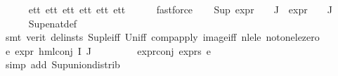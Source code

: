 \begin{isabellebody}
\ \ \ \ \isamarkupfalse%
\ e{}{\isacharunderscore}{\kern0pt}tt\ e{}{\isacharunderscore}{\kern0pt}tt\ e{}{\isacharunderscore}{\kern0pt}tt\ e{}{\isacharunderscore}{\kern0pt}tt\ e{}{\isacharunderscore}{\kern0pt}tt\ e{}{\isacharunderscore}{\kern0pt}tt\isanewline
\ \ \ \ \isamarkupfalse%
\ fastforce{\isacharplus}{\kern0pt}\isanewline
\ \ \isamarkupfalse%
\ {\isachardoublequoteopen}{\isacharparenleft}{\kern0pt}Sup\ {\isacharparenleft}{\kern0pt}{\isacharparenleft}{\kern0pt}expr{\isacharunderscore}{\kern0pt}{}\ {\isasymcirc}\ {\isasymPhi}{\isacharparenright}{\kern0pt}\ {\isacharbackquote}{\kern0pt}\ J\ {\isasymunion}\ {\isacharparenleft}{\kern0pt}expr{\isacharunderscore}{\kern0pt}{}\ {\isasymcirc}\ {\isasymPhi}{\isacharparenright}{\kern0pt}\ {\isacharbackquote}{\kern0pt}\ J{\isacharparenright}{\kern0pt}{\isacharparenright}{\kern0pt}\ {\isasymle}\ {}{\isachardoublequoteclose}\isanewline
\ \ \ \ \isamarkupfalse%
\ Sup{\isacharunderscore}{\kern0pt}enat{\isacharunderscore}{\kern0pt}def\isanewline
\ \ \ \ \isamarkupfalse%
\ {\isacharparenleft}{\kern0pt}smt\ {\isacharparenleft}{\kern0pt}verit{\isacharcomma}{\kern0pt}\ del{\isacharunderscore}{\kern0pt}insts{\isacharparenright}{\kern0pt}\ Sup{\isacharunderscore}{\kern0pt}le{\isacharunderscore}{\kern0pt}iff\ Un{\isacharunderscore}{\kern0pt}iff\ comp{\isacharunderscore}{\kern0pt}apply\ image{\isacharunderscore}{\kern0pt}iff\ nle{\isacharunderscore}{\kern0pt}le\ not{\isacharunderscore}{\kern0pt}one{\isacharunderscore}{\kern0pt}le{\isacharunderscore}{\kern0pt}zero{\isacharparenright}{\kern0pt}\isanewline
\ \ \isamarkupfalse%
\ e{}{\isacharcolon}{\kern0pt}\ {\isachardoublequoteopen}expr{\isacharunderscore}{\kern0pt}{}\ {\isacharparenleft}{\kern0pt}hml{\isacharunderscore}{\kern0pt}conj\ I\ J\ {\isasymPhi}{\isacharparenright}{\kern0pt}\ {\isasymle}\ {}{\isachardoublequoteclose}\isanewline
\ \ \ \ \isamarkupfalse%
\ expr{\isacharunderscore}{\kern0pt}{}{\isacharunderscore}{\kern0pt}conj\ expr{\isacharunderscore}{\kern0pt}{\isasympsi}s\ e{}{\isacharunderscore}{\kern0pt}{}\ \isanewline
\ \ \ \ \isamarkupfalse%
\ {\isacharparenleft}{\kern0pt}simp\ add{\isacharcolon}{\kern0pt}\ Sup{\isacharunderscore}{\kern0pt}union{\isacharunderscore}{\kern0pt}distrib{\isacharparenright}{\kern0pt}\isanewline
\ \ \isamarkupfalse%

\end{isabellebody}
